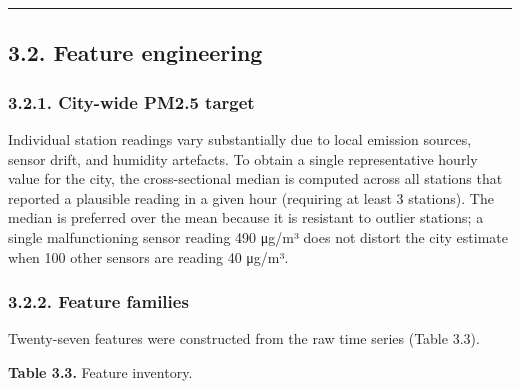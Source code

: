 \begin{center}\rule{0.5\linewidth}{0.5pt}\end{center}

\subsection{3.2. Feature engineering}\label{feature-engineering}

\subsubsection{3.2.1. City-wide PM2.5 target}\label{city-wide-pm2.5-target}

Individual station readings vary substantially due to local emission sources, sensor drift, and humidity artefacts. To obtain a single representative hourly value for the city, the cross-sectional median is computed across all stations that reported a plausible reading in a given hour (requiring at least 3 stations). The median is preferred over the mean because it is resistant to outlier stations; a single malfunctioning sensor reading 490 μg/m³ does not distort the city estimate when 100 other sensors are reading 40 μg/m³.

\subsubsection{3.2.2. Feature families}\label{feature-families}

Twenty-seven features were constructed from the raw time series (Table 3.3).

\textbf{Table 3.3.} Feature inventory.

